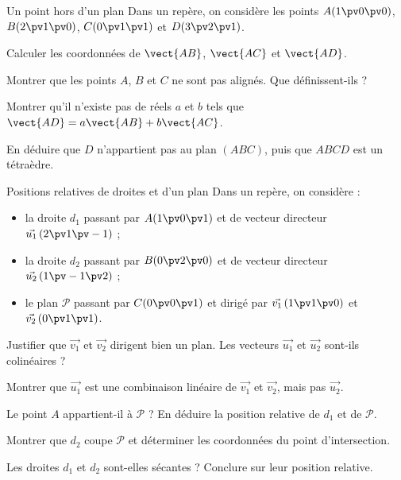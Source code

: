 \begin{exercice}[2]{Un point hors d'un plan}
Dans un repère, on considère les points $A(1\pv0\pv0)$, $B(2\pv1\pv0)$, $C(0\pv1\pv1)$ et $D(3\pv2\pv1)$.
\begin{questions}
  \item Calculer les coordonnées de $\vect{AB}$, $\vect{AC}$ et $\vect{AD}$.
  \item Montrer que les points $A$, $B$ et $C$ ne sont pas alignés. Que définissent-ils ?
  \item Montrer qu'il n'existe pas de réels $a$ et $b$ tels que $\vect{AD}=a\vect{AB}+b\vect{AC}$.
  \item En déduire que $D$ n'appartient pas au plan $(ABC)$, puis que $ABCD$ est un tétraèdre.
\end{questions}
\end{exercice}

\begin{exercice}[3]{Positions relatives de droites et d'un plan}
Dans un repère, on considère :
\begin{itemize}[leftmargin=1.4em,itemsep=0.3mm,topsep=0.5mm]
  \item la droite $d_1$ passant par $A(1\pv0\pv1)$ et de vecteur directeur $\vec{u_1}\,(2\pv1\pv-1)$ ;
  \item la droite $d_2$ passant par $B(0\pv2\pv0)$ et de vecteur directeur $\vec{u_2}\,(1\pv-1\pv2)$ ;
  \item le plan $\mathcal{P}$ passant par $C(0\pv0\pv1)$ et dirigé par $\vec{v_1}\,(1\pv1\pv0)$ et $\vec{v_2}\,(0\pv1\pv1)$.
\end{itemize}
\begin{questions}
  \item Justifier que $\vec{v_1}$ et $\vec{v_2}$ dirigent bien un plan. Les vecteurs $\vec{u_1}$ et $\vec{u_2}$ sont-ils colinéaires ?
  \item Montrer que $\vec{u_1}$ est une combinaison linéaire de $\vec{v_1}$ et $\vec{v_2}$, mais pas $\vec{u_2}$.
  \item Le point $A$ appartient-il à $\mathcal{P}$ ? En déduire la position relative de $d_1$ et de $\mathcal{P}$.
  \item Montrer que $d_2$ coupe $\mathcal{P}$ et déterminer les coordonnées du point d'intersection.
  \item Les droites $d_1$ et $d_2$ sont-elles sécantes ? Conclure sur leur position relative.
\end{questions}
\end{exercice}

